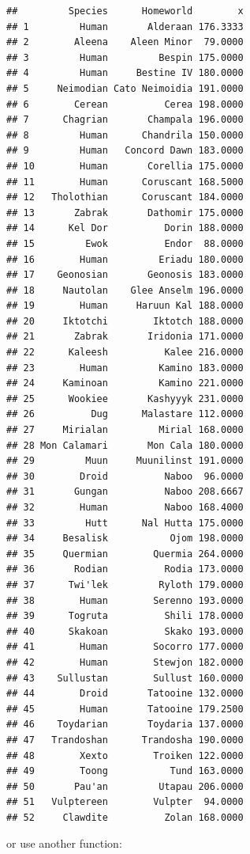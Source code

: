 \documentclass[]{gitbook}
\newenvironment{Shaded}{\begin{snugshade}}{\end{snugshade}}
\newcommand{\DataTypeTok}[1]{\textcolor[rgb]{0.13,0.29,0.53}{#1}}
\newcommand{\KeywordTok}[1]{\textcolor[rgb]{0.13,0.29,0.53}{\textbf{#1}}}
\newcommand{\NormalTok}[1]{#1}
\newcommand{\OperatorTok}[1]{\textcolor[rgb]{0.81,0.36,0.00}{\textbf{#1}}}
\theoremstyle{definition}
\theoremstyle{definition}
\theoremstyle{definition}
\theoremstyle{remark}
\begin{document}
\begin{verbatim}
##         Species      Homeworld        x
## 1         Human       Alderaan 176.3333
## 2        Aleena    Aleen Minor  79.0000
## 3         Human         Bespin 175.0000
## 4         Human     Bestine IV 180.0000
## 5     Neimodian Cato Neimoidia 191.0000
## 6        Cerean          Cerea 198.0000
## 7      Chagrian       Champala 196.0000
## 8         Human      Chandrila 150.0000
## 9         Human   Concord Dawn 183.0000
## 10        Human       Corellia 175.0000
## 11        Human      Coruscant 168.5000
## 12   Tholothian      Coruscant 184.0000
## 13       Zabrak       Dathomir 175.0000
## 14      Kel Dor          Dorin 188.0000
## 15         Ewok          Endor  88.0000
## 16        Human         Eriadu 180.0000
## 17    Geonosian       Geonosis 183.0000
## 18     Nautolan    Glee Anselm 196.0000
## 19        Human     Haruun Kal 188.0000
## 20     Iktotchi        Iktotch 188.0000
## 21       Zabrak       Iridonia 171.0000
## 22      Kaleesh          Kalee 216.0000
## 23        Human         Kamino 183.0000
## 24     Kaminoan         Kamino 221.0000
## 25      Wookiee       Kashyyyk 231.0000
## 26          Dug      Malastare 112.0000
## 27     Mirialan         Mirial 168.0000
## 28 Mon Calamari       Mon Cala 180.0000
## 29         Muun     Muunilinst 191.0000
## 30        Droid          Naboo  96.0000
## 31       Gungan          Naboo 208.6667
## 32        Human          Naboo 168.4000
## 33         Hutt      Nal Hutta 175.0000
## 34     Besalisk           Ojom 198.0000
## 35     Quermian        Quermia 264.0000
## 36       Rodian          Rodia 173.0000
## 37      Twi'lek         Ryloth 179.0000
## 38        Human        Serenno 193.0000
## 39      Togruta          Shili 178.0000
## 40      Skakoan          Skako 193.0000
## 41        Human        Socorro 177.0000
## 42        Human        Stewjon 182.0000
## 43    Sullustan        Sullust 160.0000
## 44        Droid       Tatooine 132.0000
## 45        Human       Tatooine 179.2500
## 46    Toydarian       Toydaria 137.0000
## 47   Trandoshan      Trandosha 190.0000
## 48        Xexto        Troiken 122.0000
## 49        Toong           Tund 163.0000
## 50       Pau'an         Utapau 206.0000
## 51   Vulptereen        Vulpter  94.0000
## 52     Clawdite          Zolan 168.0000
\end{verbatim}

or use another function:

\begin{Shaded}
\end{Shaded}
\end{document}
